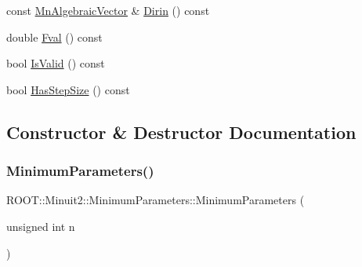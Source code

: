 \begin{DoxyCompactItemize}
\item 
const \mbox{\hyperlink{namespaceROOT_1_1Minuit2_a62ed97730a1ca8d3fbaec64a19aa11c9}{Mn\+Algebraic\+Vector}} \& \mbox{\hyperlink{classROOT_1_1Minuit2_1_1MinimumParameters_a2c5c5f0add9ecbdf6b5d4ff962d68d15}{Dirin}} () const
\item 
double \mbox{\hyperlink{classROOT_1_1Minuit2_1_1MinimumParameters_a1f9cd63f5947771e367bedd4dafa54e3}{Fval}} () const
\item 
bool \mbox{\hyperlink{classROOT_1_1Minuit2_1_1MinimumParameters_a4b30eb313781bc8e344efa322461952a}{Is\+Valid}} () const
\item 
bool \mbox{\hyperlink{classROOT_1_1Minuit2_1_1MinimumParameters_a5533f870590176dbcf5b3e04e6470fd9}{Has\+Step\+Size}} () const
\end{DoxyCompactItemize}


\subsection{Constructor \& Destructor Documentation}
\mbox{\label{classROOT_1_1Minuit2_1_1MinimumParameters_aa6d319726e98ab129fea9d93268a21da}} 
\subsubsection{\texorpdfstring{MinimumParameters()}{MinimumParameters()}\hspace{0.1cm}{\footnotesize\ttfamily [1/8]}}
{\footnotesize\ttfamily R\+O\+O\+T\+::\+Minuit2\+::\+Minimum\+Parameters\+::\+Minimum\+Parameters (\begin{DoxyParamCaption}\item[{unsigned int}]{n }\end{DoxyParamCaption})\hspace{0.3cm}{\ttfamily [inline]}}

\mbox{\label{classROOT_1_1Minuit2_1_1MinimumParameters_a72fd528946a07bcf3e320c0505953aa8}} 
